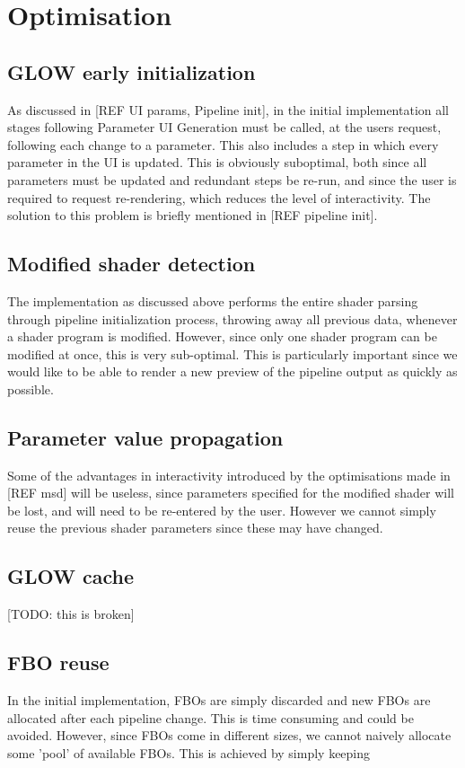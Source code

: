 \documentclass[12pt,twoside,notitlepage]{report}
\begin{document}
\section{Optimisation}\subsection{GLOW early initialization}
As discussed in [REF UI params, Pipeline init], in the initial implementation all stages following Parameter UI Generation must be called, at the users request, following each change to a parameter. This also includes a step in which every parameter in the UI is updated. This is obviously suboptimal, both since all parameters must be updated and redundant steps be re-run, and since the user is required to request re-rendering, which reduces the level of interactivity.
The solution to this problem is briefly mentioned in [REF pipeline init].

\subsection{Modified shader detection}
The implementation as discussed above performs the entire shader parsing through pipeline initialization process, throwing away all previous data, whenever a shader program is modified. However, since only one shader program can be modified at once, this is very sub-optimal. This is particularly important since we would like to be able to render a new preview of the pipeline output as quickly as possible.

\subsection{Parameter value propagation}
Some of the advantages in interactivity introduced by the optimisations made in [REF msd] will be useless, since parameters specified for the modified shader will be lost, and will need to be re-entered by the user. However we cannot simply reuse the previous shader parameters since these may have changed.

\subsection{GLOW cache}
[TODO: this is broken]

\subsection{FBO reuse}
In the initial implementation, FBOs are simply discarded and new FBOs are allocated after each pipeline change. This is time consuming and could be avoided. However, since FBOs come in different sizes, we cannot naively allocate some 'pool' of available FBOs. This is achieved by simply keeping
\end{document}
